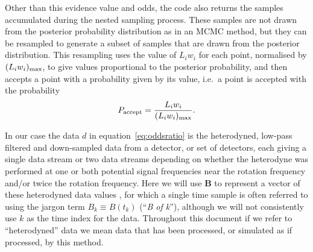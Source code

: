 Other than this evidence value and odds, the code also returns the samples accumulated during
the nested sampling process. These samples are not drawn from the posterior probability distribution as in
an MCMC method, but they can be resampled to generate a subset of samples that are drawn from the posterior
distribution. This resampling \citep[performed using the {\tt lalapps\_nest2pos} {\tt python} script within
{\tt lalapps}][]{lalsuite} uses the
value of $L_i w_i$ for each point, normalised by $(L_iw_i)_{\rm max}$, to give values proportional to the
posterior probability, and then accepts a point with a probability given by its value, i.e.\ a point is
accepted with the probability
\begin{equation}\label{eq:postaccept}
P_{\text{accept}} = \frac{L_i w_i}{(L_iw_i)_{\rm max}}.
\end{equation}

In our case the data $d$ in equation~\ref{eq:oddsratio} is the heterodyned, low-pass filtered and down-sampled data
from a detector, or set of detectors, each giving a single data stream or two data streams depending on
whether the heterodyne was performed at one or both potential signal frequencies near the rotation frequency
and/or twice the rotation frequency. Here we will use $\mathbf{B}$ to represent a vector of these heterodyned
data values \citep{2005PhRvD..72j2002D}, for which a single time sample is often referred to using the jargon term $B_k \equiv B(t_k)$ (``{\it B of k}''), although we will
not consistently use $k$ as the time index for the data. Throughout this document if we refer to ``heterodyned'' data we mean
data that has been processed, or simulated as if processed, by this method.
